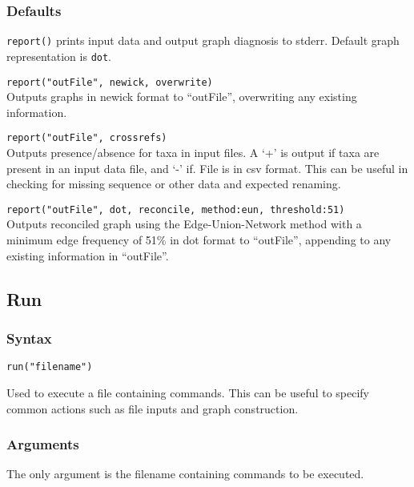 	\subsubsection{Defaults}
		\texttt{report()} prints input data and output graph diagnosis to stderr. Default graph 
		representation is \texttt{dot}.
		
	\begin{example}
		\item{\texttt{report("outFile", newick, overwrite)}\\ Outputs graphs in newick format to 
		``outFile'', overwriting any existing information.}
		
		\item{\texttt{report("outFile", crossrefs)}\\ Outputs presence/absence for taxa in input files. 
		A `+' is output if taxa are present in an input data file, and `-' if. File is in csv format. This 
		can be useful in checking for missing sequence or other data and expected renaming.}
		
		\item{\texttt{report("outFile", dot, reconcile, method:eun, threshold:51)}\\ Outputs reconciled 
		graph using the Edge-Union-Network method with a minimum edge frequency of 51\% in 
		dot format to ``outFile'', appending to any existing information in ``outFile''.}
	\end{example}

\subsection{Run}
	\subsubsection{Syntax}
		\texttt{run("filename")}
		
	\begin{phygdescription}
		{Used to execute a file containing commands. This can be useful to specify common actions 
		such as file inputs and graph construction. }
	\end{phygdescription}
	
	\subsubsection{Arguments}
		The only argument is the filename containing commands to be executed.
		
